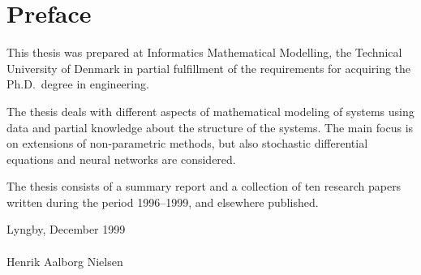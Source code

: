 \chapter{Preface}

This thesis was prepared at Informatics Mathematical Modelling,
the Technical University of Denmark in partial fulfillment of the
requirements for acquiring the Ph.D.\ degree in engineering.

The thesis deals with different aspects of mathematical modeling of
systems using data and partial knowledge about the structure of the
systems.  The main focus is on extensions of non-parametric methods,
but also stochastic differential equations and neural networks are
considered.

The thesis consists of a summary report and a collection of ten
research papers written during the period 1996--1999, and elsewhere
published.

\vspace{20mm}
\mbox{}\hfill
\begin{minipage}[t]{80mm}
  Lyngby, December 1999
  \\ \\
  Henrik Aalborg Nielsen
\end{minipage}
